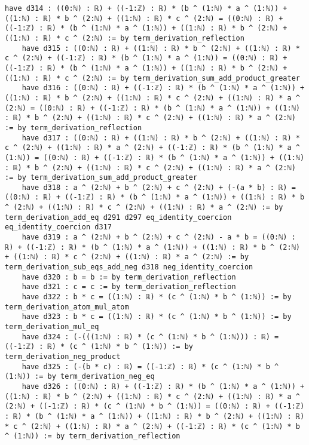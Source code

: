 \documentclass{article}
\begin{document}
\begin{tcolorbox}[colback=white!10, width=\linewidth]
\begin{lstlisting}[language=Lean4]
    have d314 : ((0:ℕ) : ℝ) + ((-1:ℤ) : ℝ) * (b ^ (1:ℕ) * a ^ (1:ℕ)) + ((1:ℕ) : ℝ) * b ^ (2:ℕ) + ((1:ℕ) : ℝ) * c ^ (2:ℕ) = ((0:ℕ) : ℝ) + ((-1:ℤ) : ℝ) * (b ^ (1:ℕ) * a ^ (1:ℕ)) + ((1:ℕ) : ℝ) * b ^ (2:ℕ) + ((1:ℕ) : ℝ) * c ^ (2:ℕ) := by term_derivation_reflection
    have d315 : ((0:ℕ) : ℝ) + ((1:ℕ) : ℝ) * b ^ (2:ℕ) + ((1:ℕ) : ℝ) * c ^ (2:ℕ) + ((-1:ℤ) : ℝ) * (b ^ (1:ℕ) * a ^ (1:ℕ)) = ((0:ℕ) : ℝ) + ((-1:ℤ) : ℝ) * (b ^ (1:ℕ) * a ^ (1:ℕ)) + ((1:ℕ) : ℝ) * b ^ (2:ℕ) + ((1:ℕ) : ℝ) * c ^ (2:ℕ) := by term_derivation_sum_add_product_greater
    have d316 : ((0:ℕ) : ℝ) + ((-1:ℤ) : ℝ) * (b ^ (1:ℕ) * a ^ (1:ℕ)) + ((1:ℕ) : ℝ) * b ^ (2:ℕ) + ((1:ℕ) : ℝ) * c ^ (2:ℕ) + ((1:ℕ) : ℝ) * a ^ (2:ℕ) = ((0:ℕ) : ℝ) + ((-1:ℤ) : ℝ) * (b ^ (1:ℕ) * a ^ (1:ℕ)) + ((1:ℕ) : ℝ) * b ^ (2:ℕ) + ((1:ℕ) : ℝ) * c ^ (2:ℕ) + ((1:ℕ) : ℝ) * a ^ (2:ℕ) := by term_derivation_reflection
    have d317 : ((0:ℕ) : ℝ) + ((1:ℕ) : ℝ) * b ^ (2:ℕ) + ((1:ℕ) : ℝ) * c ^ (2:ℕ) + ((1:ℕ) : ℝ) * a ^ (2:ℕ) + ((-1:ℤ) : ℝ) * (b ^ (1:ℕ) * a ^ (1:ℕ)) = ((0:ℕ) : ℝ) + ((-1:ℤ) : ℝ) * (b ^ (1:ℕ) * a ^ (1:ℕ)) + ((1:ℕ) : ℝ) * b ^ (2:ℕ) + ((1:ℕ) : ℝ) * c ^ (2:ℕ) + ((1:ℕ) : ℝ) * a ^ (2:ℕ) := by term_derivation_sum_add_product_greater
    have d318 : a ^ (2:ℕ) + b ^ (2:ℕ) + c ^ (2:ℕ) + (-(a * b) : ℝ) = ((0:ℕ) : ℝ) + ((-1:ℤ) : ℝ) * (b ^ (1:ℕ) * a ^ (1:ℕ)) + ((1:ℕ) : ℝ) * b ^ (2:ℕ) + ((1:ℕ) : ℝ) * c ^ (2:ℕ) + ((1:ℕ) : ℝ) * a ^ (2:ℕ) := by term_derivation_add_eq d291 d297 eq_identity_coercion eq_identity_coercion d317
    have d319 : a ^ (2:ℕ) + b ^ (2:ℕ) + c ^ (2:ℕ) - a * b = ((0:ℕ) : ℝ) + ((-1:ℤ) : ℝ) * (b ^ (1:ℕ) * a ^ (1:ℕ)) + ((1:ℕ) : ℝ) * b ^ (2:ℕ) + ((1:ℕ) : ℝ) * c ^ (2:ℕ) + ((1:ℕ) : ℝ) * a ^ (2:ℕ) := by term_derivation_sub_eqs_add_neg d318 neg_identity_coercion
    have d320 : b = b := by term_derivation_reflection
    have d321 : c = c := by term_derivation_reflection
    have d322 : b * c = ((1:ℕ) : ℝ) * (c ^ (1:ℕ) * b ^ (1:ℕ)) := by term_derivation_atom_mul_atom
    have d323 : b * c = ((1:ℕ) : ℝ) * (c ^ (1:ℕ) * b ^ (1:ℕ)) := by term_derivation_mul_eq
    have d324 : (-(((1:ℕ) : ℝ) * (c ^ (1:ℕ) * b ^ (1:ℕ))) : ℝ) = ((-1:ℤ) : ℝ) * (c ^ (1:ℕ) * b ^ (1:ℕ)) := by term_derivation_neg_product
    have d325 : (-(b * c) : ℝ) = ((-1:ℤ) : ℝ) * (c ^ (1:ℕ) * b ^ (1:ℕ)) := by term_derivation_neg_eq
    have d326 : ((0:ℕ) : ℝ) + ((-1:ℤ) : ℝ) * (b ^ (1:ℕ) * a ^ (1:ℕ)) + ((1:ℕ) : ℝ) * b ^ (2:ℕ) + ((1:ℕ) : ℝ) * c ^ (2:ℕ) + ((1:ℕ) : ℝ) * a ^ (2:ℕ) + ((-1:ℤ) : ℝ) * (c ^ (1:ℕ) * b ^ (1:ℕ)) = ((0:ℕ) : ℝ) + ((-1:ℤ) : ℝ) * (b ^ (1:ℕ) * a ^ (1:ℕ)) + ((1:ℕ) : ℝ) * b ^ (2:ℕ) + ((1:ℕ) : ℝ) * c ^ (2:ℕ) + ((1:ℕ) : ℝ) * a ^ (2:ℕ) + ((-1:ℤ) : ℝ) * (c ^ (1:ℕ) * b ^ (1:ℕ)) := by term_derivation_reflection

\end{lstlisting}
\end{tcolorbox}
\end{document}
